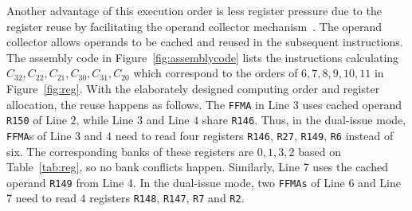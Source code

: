 Another advantage of this execution order is less register pressure due to the register reuse by facilitating the operand collector mechanism~\cite{collector}. The operand collector allows operands to be cached and reused in the subsequent instructions.
The assembly code in Figure~\ref{fig:assemblycode} lists the instructions calculating $C_{32},C_{22}, C_{21}, C_{30},
C_{31}, C_{20}$ which correspond to the orders of $6,7,8,9,10,11$ in Figure~\ref{fig:reg}.
With the elaborately designed computing order and register allocation, the reuse happens as follows. The {\tt FFMA} in
Line $3$ uses cached operand {\tt R150} of Line $2$, while Line $3$ and Line $4$ share {\tt R146}. Thus, in the dual-issue mode,
{\tt FFMA}s of Line $3$ and $4$ need to read four registers {\tt R146}, {\tt R27}, {\tt R149}, {\tt R6} instead of six. The corresponding banks of these registers are $0,1,3,2$ based on Table~\ref{tab:reg}, so no bank conflicts happen.
Similarly, Line 7 uses the cached operand {\tt R149} from Line 4. In the dual-issue mode, two {\tt FFMAs} of Line 6 and
Line 7 need to read $4$ registers {\tt R148}, {\tt R147}, {\tt R7} and {\tt R2}.
